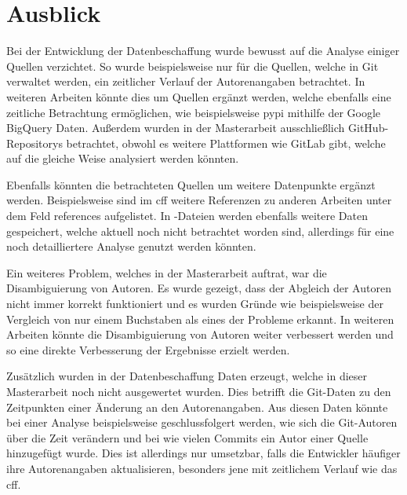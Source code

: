 \section{Ausblick}
\label{sec:ausblick}
Bei der Entwicklung der Datenbeschaffung wurde bewusst auf die Analyse einiger Quellen verzichtet.
So wurde beispielsweise nur für die Quellen, welche in Git verwaltet werden, ein zeitlicher Verlauf der Autorenangaben betrachtet.
In weiteren Arbeiten könnte dies um Quellen ergänzt werden, welche ebenfalls eine zeitliche Betrachtung ermöglichen, wie beispielsweise \gls{pypi} mithilfe der Google BigQuery Daten.
Außerdem wurden in der Masterarbeit ausschließlich GitHub-Repositorys betrachtet, obwohl es weitere Plattformen wie GitLab gibt, welche auf die gleiche Weise analysiert werden könnten.

Ebenfalls könnten die betrachteten Quellen um weitere Datenpunkte ergänzt werden.
Beispielsweise sind im \gls{cff} weitere Referenzen zu anderen Arbeiten unter dem Feld \glqq references\grqq{} aufgelistet.
In -Dateien werden ebenfalls weitere Daten gespeichert, welche aktuell noch nicht betrachtet worden sind, allerdings für eine noch detailliertere Analyse genutzt werden könnten.

Ein weiteres Problem, welches in der Masterarbeit auftrat, war die Disambiguierung von Autoren.
Es wurde gezeigt, dass der Abgleich der Autoren nicht immer korrekt funktioniert und es wurden Gründe wie beispielsweise der Vergleich von nur einem Buchstaben als eines der Probleme erkannt.
In weiteren Arbeiten könnte die Disambiguierung von Autoren weiter verbessert werden und so eine direkte Verbesserung der Ergebnisse erzielt werden.

Zusätzlich wurden in der Datenbeschaffung Daten erzeugt, welche in dieser Masterarbeit noch nicht ausgewertet wurden.
Dies betrifft die Git-Daten zu den Zeitpunkten einer Änderung an den Autorenangaben.
Aus diesen Daten könnte bei einer Analyse beispielsweise geschlussfolgert werden, wie sich die Git-Autoren über die Zeit verändern und bei wie vielen Commits ein Autor einer Quelle hinzugefügt wurde.
Dies ist allerdings nur umsetzbar, falls die Entwickler häufiger ihre Autorenangaben aktualisieren, besonders jene mit zeitlichem Verlauf wie das \gls{cff}.
